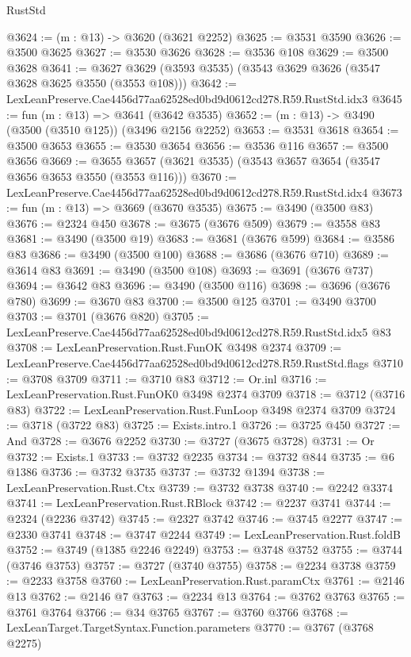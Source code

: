 \begin{lexlean}{RustStd}
\begin{coremodule}
@3624 := (m : @13) -> @3620 (@3621 @2252)
@3625 := @3531 @3590
@3626 := @3500 @3625
@3627 := @3530 @3626
@3628 := @3536 @108
@3629 := @3500 @3628
@3641 := @3627 @3629 (@3593 @3535) (@3543 @3629 @3626 (@3547 @3628 @3625 @3550 (@3553 @108)))
@3642 := LexLeanPreserve.Cae4456d77aa62528ed0bd9d0612cd278.R59.RustStd.idx3
@3645 := fun (m : @13) => @3641 (@3642 @3535)
@3652 := (m : @13) -> @3490 (@3500 (@3510 @125)) (@3496 @2156 @2252)
@3653 := @3531 @3618
@3654 := @3500 @3653
@3655 := @3530 @3654
@3656 := @3536 @116
@3657 := @3500 @3656
@3669 := @3655 @3657 (@3621 @3535) (@3543 @3657 @3654 (@3547 @3656 @3653 @3550 (@3553 @116)))
@3670 := LexLeanPreserve.Cae4456d77aa62528ed0bd9d0612cd278.R59.RustStd.idx4
@3673 := fun (m : @13) => @3669 (@3670 @3535)
@3675 := @3490 (@3500 @83)
@3676 := @2324 @450
@3678 := @3675 (@3676 @509)
@3679 := @3558 @83
@3681 := @3490 (@3500 @19)
@3683 := @3681 (@3676 @599)
@3684 := @3586 @83
@3686 := @3490 (@3500 @100)
@3688 := @3686 (@3676 @710)
@3689 := @3614 @83
@3691 := @3490 (@3500 @108)
@3693 := @3691 (@3676 @737)
@3694 := @3642 @83
@3696 := @3490 (@3500 @116)
@3698 := @3696 (@3676 @780)
@3699 := @3670 @83
@3700 := @3500 @125
@3701 := @3490 @3700
@3703 := @3701 (@3676 @820)
@3705 := LexLeanPreserve.Cae4456d77aa62528ed0bd9d0612cd278.R59.RustStd.idx5 @83
@3708 := LexLeanPreservation.Rust.FunOK @3498 @2374
@3709 := LexLeanPreserve.Cae4456d77aa62528ed0bd9d0612cd278.R59.RustStd.flags
@3710 := @3708 @3709
@3711 := @3710 @83
@3712 := Or.inl
@3716 := LexLeanPreservation.Rust.FunOK0 @3498 @2374 @3709
@3718 := @3712 (@3716 @83)
@3722 := LexLeanPreservation.Rust.FunLoop @3498 @2374 @3709
@3724 := @3718 (@3722 @83)
@3725 := Exists.intro.{1}
@3726 := @3725 @450
@3727 := And
@3728 := @3676 @2252
@3730 := @3727 (@3675 @3728)
@3731 := Or
@3732 := Exists.{1}
@3733 := @3732 @2235
@3734 := @3732 @844
@3735 := @6 @1386
@3736 := @3732 @3735
@3737 := @3732 @1394
@3738 := LexLeanPreservation.Rust.Ctx
@3739 := @3732 @3738
@3740 := @2242 @3374
@3741 := LexLeanPreservation.Rust.RBlock
@3742 := @2237 @3741
@3744 := @2324 (@2236 @3742)
@3745 := @2327 @3742
@3746 := @3745 @2277
@3747 := @2330 @3741
@3748 := @3747 @2244
@3749 := LexLeanPreservation.Rust.foldB
@3752 := @3749 (@1385 @2246 @2249)
@3753 := @3748 @3752
@3755 := @3744 (@3746 @3753)
@3757 := @3727 (@3740 @3755)
@3758 := @2234 @3738
@3759 := @2233 @3758
@3760 := LexLeanPreservation.Rust.paramCtx
@3761 := @2146 @13
@3762 := @2146 @7
@3763 := @2234 @13
@3764 := @3762 @3763
@3765 := @3761 @3764
@3766 := @34 @3765
@3767 := @3760 @3766
@3768 := LexLeanTarget.TargetSyntax.Function.parameters
@3770 := @3767 (@3768 @2275)

\end{coremodule}
\end{lexlean}
